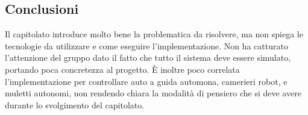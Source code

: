 \subsection{Conclusioni}
Il capitolato introduce molto bene la problematica da risolvere, ma non spiega le tecnologie da utilizzare e come eseguire l'implementazione.
Non ha catturato l'attenzione del gruppo dato il fatto che tutto il sistema deve essere simulato, portando poca concretezza al progetto.
È inoltre poco correlata l'implementazione per controllare auto a guida automona, camerieri robot, e muletti autonomi, non rendendo chiara la modalità di pensiero che si deve avere durante lo svolgimento del capitolato.